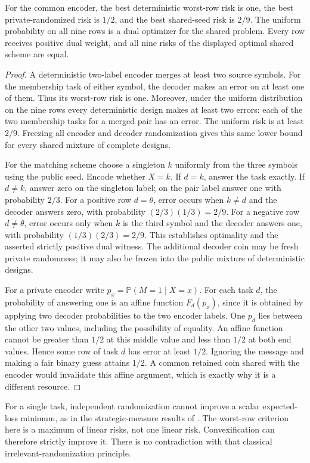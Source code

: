 \begin{theorem}\label{thm:v10-membership}
For the common encoder, the best deterministic worst-row risk is one,
the best private-randomized risk is $1/2$, and the best shared-seed
risk is $2/9$. The uniform probability on all nine rows is a dual
optimizer for the shared problem. Every row receives positive dual
weight, and all nine risks of the displayed optimal shared scheme
are equal.
\end{theorem}
\begin{proof}
A deterministic two-label encoder merges at least two source symbols.
For the membership task of either symbol, the decoder makes an error
on at least one of them. Thus its worst-row risk is one. Moreover,
under the uniform distribution on the nine rows every deterministic
design makes at least two errors: each of the two membership tasks
for a merged pair has an error. The uniform risk is at least $2/9$.
Freezing all encoder and decoder randomization gives this same lower
bound for every shared mixture of complete designs.

For the matching scheme choose a singleton $k$ uniformly from the
three symbols using the public seed. Encode whether $X=k$. If $d=k$,
answer the task exactly. If $d\ne k$, answer zero on the singleton
label; on the pair label answer one with probability $2/3$. For a
positive row $d=\theta$, error occurs when $k\ne d$ and the decoder
answers zero, with probability $(2/3)(1/3)=2/9$. For a negative row
$d\ne\theta$, error occurs only when $k$ is the third symbol and the
decoder answers one, with probability $(1/3)(2/3)=2/9$. This establishes
optimality and the asserted strictly positive dual witness. The
additional decoder coin may be fresh private randomness; it may also
be frozen into the public mixture of deterministic designs.

For a private encoder write $p_x=\mathbb P(M=1\mid X=x)$. For each
task $d$, the probability of answering one is an affine function
$F_d(p_x)$, since it is obtained by applying two decoder probabilities
to the two encoder labels. One $p_d$ lies between the other two values,
including the possibility of equality. An affine function cannot be
greater than $1/2$ at this middle value and less than $1/2$ at both
end values. Hence some row of task $d$ has error at least $1/2$.
Ignoring the message and making a fair binary guess attains $1/2$.
A common retained coin shared with the encoder would invalidate this
affine argument, which is exactly why it is a different resource.
\end{proof}

For a single task, independent randomization cannot improve a scalar
expected-loss minimum, as in the strategic-measure results of
\cite{YukselSaldi2017}. The worst-row criterion here is a maximum of
linear risks, not one linear risk. Convexification can therefore
strictly improve it. There is no contradiction with that classical
irrelevant-randomization principle.
